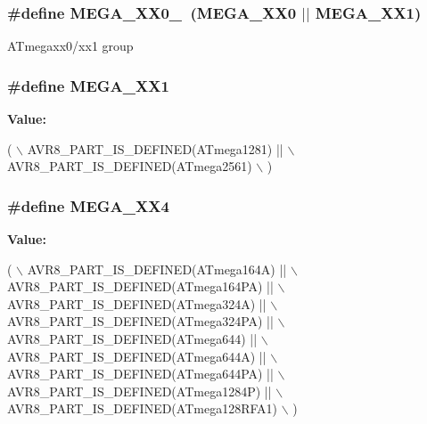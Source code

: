 \hypertarget{group__mega__part__macros__group_ga59ba73abcf65d3d398e7d37d78c271fe}{
\subsubsection[{M\-E\-G\-A\-\_\-\-X\-X0\-\_\-1}]{\setlength{\rightskip}{0pt plus 5cm}\#define M\-E\-G\-A\-\_\-\-X\-X0\-\_~(M\-E\-G\-A\-\_\-\-X\-X0 $|$$|$ M\-E\-G\-A\-\_\-\-X\-X1)}}\label{group__mega__part__macros__group_ga59ba73abcf65d3d398e7d37d78c271fe}
A\-Tmegaxx0/xx1 group \hypertarget{group__mega__part__macros__group_ga9ed7e955cff24655d99517f91d9f6392}{
\subsubsection[{M\-E\-G\-A\-\_\-\-X\-X1}]{\setlength{\rightskip}{0pt plus 5cm}\#define M\-E\-G\-A\-\_\-\-X\-X1}}\label{group__mega__part__macros__group_ga9ed7e955cff24655d99517f91d9f6392}
{\bfseries Value\-:}
\begin{DoxyCode}
( \(\backslash\)
                AVR8\_PART\_IS\_DEFINED(ATmega1281) || \(\backslash\)
                AVR8\_PART\_IS\_DEFINED(ATmega2561) \(\backslash\)
                )
\end{DoxyCode}
\hypertarget{group__mega__part__macros__group_gadcf5297df4d3d2f2bb5ccd7d6e3578b6}{
\subsubsection[{M\-E\-G\-A\-\_\-\-X\-X4}]{\setlength{\rightskip}{0pt plus 5cm}\#define M\-E\-G\-A\-\_\-\-X\-X4}}\label{group__mega__part__macros__group_gadcf5297df4d3d2f2bb5ccd7d6e3578b6}
{\bfseries Value\-:}
\begin{DoxyCode}
( \(\backslash\)
                AVR8\_PART\_IS\_DEFINED(ATmega164A)  || \(\backslash\)
                AVR8\_PART\_IS\_DEFINED(ATmega164PA) || \(\backslash\)
                AVR8\_PART\_IS\_DEFINED(ATmega324A)  || \(\backslash\)
                AVR8\_PART\_IS\_DEFINED(ATmega324PA) || \(\backslash\)
                AVR8\_PART\_IS\_DEFINED(ATmega644)   || \(\backslash\)
                AVR8\_PART\_IS\_DEFINED(ATmega644A)  || \(\backslash\)
                AVR8\_PART\_IS\_DEFINED(ATmega644PA) || \(\backslash\)
                AVR8\_PART\_IS\_DEFINED(ATmega1284P)   || \(\backslash\)
                AVR8\_PART\_IS\_DEFINED(ATmega128RFA1) \(\backslash\)
                )
\end{DoxyCode}
